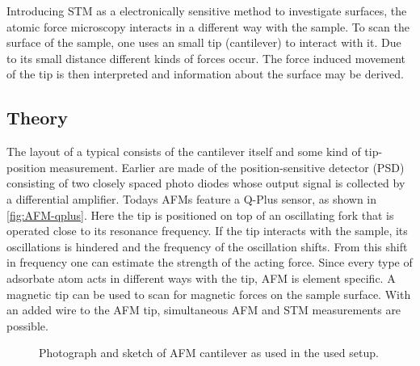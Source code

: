 Introducing STM as a electronically sensitive method to investigate surfaces, the atomic force microscopy interacts in a different way with the sample.
To scan the surface of the sample, one uses an small tip (cantilever) to interact with it. Due to its small distance different kinds of forces occur. The force induced movement of the tip is then interpreted and information about the surface may be derived.
\subsection{Theory}
The layout of a typical  consists of the cantilever itself and some kind of tip-position measurement. Earlier are made of the position-sensitive detector (PSD) consisting of two closely spaced photo diodes whose output signal is collected by a differential amplifier. Todays AFMs feature a Q-Plus sensor, as shown in \autoref{fig:AFM-qplus}. Here the tip is positioned on top of an oscillating fork that is operated close to its resonance frequency. If the tip interacts with the sample, its oscillations is hindered and the frequency of the oscillation shifts. From this shift in frequency one can estimate the strength of the acting force. Since every type of adsorbate atom acts in different ways with the tip, AFM is element specific. A magnetic tip can be used to scan for magnetic forces on the sample surface. With an added wire to the AFM tip, simultaneous AFM and STM measurements are possible. 

\begin{figure}\centering
	
	\caption{Photograph  and sketch  of AFM cantilever as used in the used setup. }
	\label{fig:AFM-tuning-fork}
\end{figure}	


